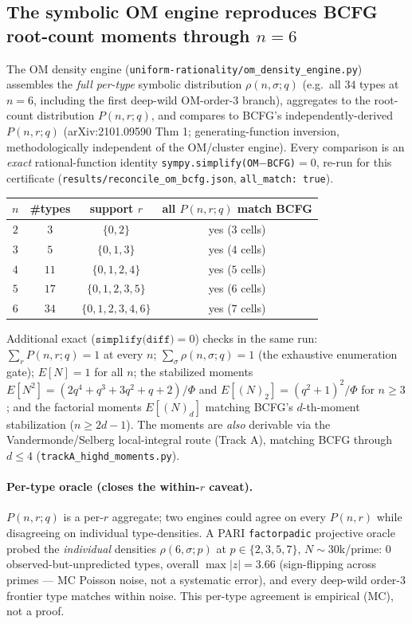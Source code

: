 \documentclass[11pt]{article}
\newcommand{\code}[1]{\texttt{#1}}
\begin{document}
\subsection{The symbolic OM engine reproduces BCFG root-count moments through $n=6$}

The OM density engine (\code{uniform-rationality/om\_density\_engine.py}) assembles the
\emph{full per-type} symbolic distribution $\rho(n,\sigma;q)$ (e.g.\ all $34$ types at
$n=6$, including the first deep-wild OM-order-$3$ branch), aggregates to the root-count
distribution $P(n,r;q)$, and compares to BCFG's independently-derived $P(n,r;q)$
(arXiv:2101.09590 Thm 1; generating-function inversion, methodologically independent of
the OM/cluster engine). Every comparison is an \emph{exact} rational-function identity
\code{sympy.simplify(OM$-$BCFG)$=0$}, re-run for this certificate
(\code{results/reconcile\_om\_bcfg.json}, \code{all\_match: true}).

\begin{longtable}{@{}cccc@{}}
\toprule
$n$ & \#types & support $r$ & all $P(n,r;q)$ match BCFG \\
\midrule
\endhead
$2$ & $3$  & $\{0,2\}$       & yes ($3$ cells) \\
$3$ & $5$  & $\{0,1,3\}$     & yes ($4$ cells) \\
$4$ & $11$ & $\{0,1,2,4\}$   & yes ($5$ cells) \\
$5$ & $17$ & $\{0,1,2,3,5\}$ & yes ($6$ cells) \\
$6$ & $34$ & $\{0,1,2,3,4,6\}$ & yes ($7$ cells) \\
\bottomrule
\end{longtable}

\noindent Additional exact ($\code{simplify(diff)}=0$) checks in the same run:
$\sum_r P(n,r;q)=1$ at every $n$; $\sum_\sigma \rho(n,\sigma;q)=1$ (the exhaustive
enumeration gate); $E[N]=1$ for all $n$; the stabilized moments
$E[N^2]=(2q^4+q^3+3q^2+q+2)/\Phi$ and $E[(N)_2]=(q^2+1)^2/\Phi$ for $n\ge3$; and the
factorial moments $E[(N)_d]$ matching BCFG's $d$-th-moment stabilization
($n\ge2d-1$). The moments are \emph{also} derivable via the Vandermonde/Selberg
local-integral route (Track A), matching BCFG through $d\le4$
(\code{trackA\_highd\_moments.py}).

\paragraph{Per-type oracle (closes the within-$r$ caveat).} $P(n,r;q)$ is a per-$r$
aggregate; two engines could agree on every $P(n,r)$ while disagreeing on individual
type-densities. A PARI \code{factorpadic} projective oracle probed the \emph{individual}
densities $\rho(6,\sigma;p)$ at $p\in\{2,3,5,7\}$, $N\sim30$k/prime: $0$
observed-but-unpredicted types, overall $\max|z|=3.66$ (sign-flipping across primes ---
MC Poisson noise, not a systematic error), and every deep-wild order-$3$ frontier type
matches within noise. This per-type agreement is empirical (MC), not a proof.
\end{document}
